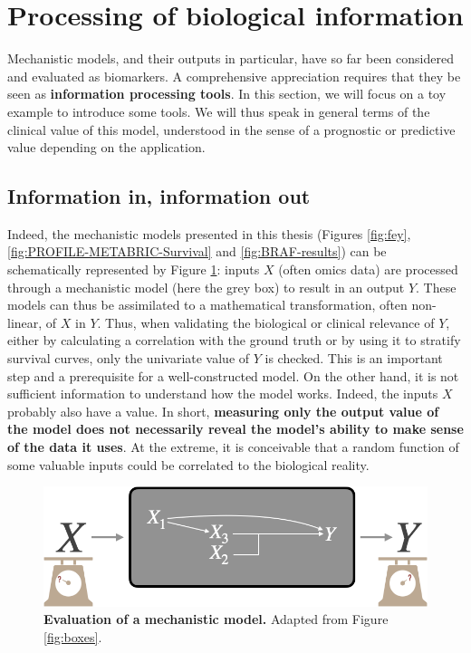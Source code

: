 \documentclass[a4paper,12pt,twoside,onecolumn,openright,final,oldfontcommands]{memoir}
\begin{document}
\section{Processing of biological
information}\label{processing-of-biological-information}

Mechanistic models, and their outputs in particular, have so far been
considered and evaluated as biomarkers. A comprehensive appreciation
requires that they be seen as \textbf{information processing tools}. In
this section, we will focus on a toy example to introduce some tools. We
will thus speak in general terms of the clinical value of this model,
understood in the sense of a prognostic or predictive value depending on
the application.

\subsection{Information in, information
out}\label{information-in-information-out}

Indeed, the mechanistic models presented in this thesis (Figures
\ref{fig:fey}, \ref{fig:PROFILE-METABRIC-Survival} and
\ref{fig:BRAF-results}) can be schematically represented by Figure
\ref{fig:box-mech}: inputs \(X\) (often omics data) are processed
through a mechanistic model (here the grey box) to result in an output
\(Y\). These models can thus be assimilated to a mathematical
transformation, often non-linear, of \(X\) in \(Y\). Thus, when
validating the biological or clinical relevance of \(Y\), either by
calculating a correlation with the ground truth or by using it to
stratify survival curves, only the univariate value of \(Y\) is checked.
This is an important step and a prerequisite for a well-constructed
model. On the other hand, it is not sufficient information to understand
how the model works. Indeed, the inputs \(X\) probably also have a
value. In short, \textbf{measuring only the output value of the model
does not necessarily reveal the model's ability to make sense of the
data it uses}. At the extreme, it is conceivable that a random function
of some valuable inputs could be correlated to the biological reality.

\begin{figure}

{\centering \includegraphics[width=0.8\linewidth]{fig/box-mech} 

}

\caption[Evaluation of a mechanistic model]{\textbf{Evaluation of a mechanistic model.}
Adapted from Figure \ref{fig:boxes}.}\label{fig:box-mech}
\end{figure}
\end{document}
